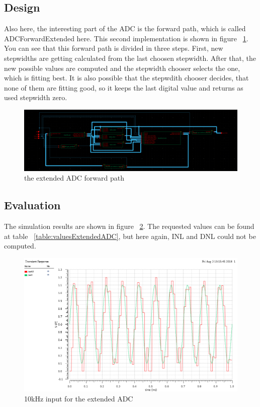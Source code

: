 \subsection{Design}
Also here, the interesting part of the ADC is the forward path, which is called ADCForwardExtended here. This second implementation is shown in figure ~\ref{fig:extendedForward}. You can see that this forward path is divided in three steps. First, new stepwidths are getting calculated from the last choosen stepwidth. After that, the new possible values are computed and the stepwidth chooser selects the one, which is fitting best. It is also possible that the stepwdith chooser decides, that none of them are fitting good, so it keeps the last digital value and returns as used stepwidth zero.

\begin{figure}[h]
	\centering
	\includegraphics[scale=0.225]{images/adc/adcForwardExtended.png}
	\caption{the extended ADC forward path}
	\label{fig:extendedForward}
\end{figure}


\subsection{Evaluation}

The simulation results are shown in figure ~\ref{fig:extendedAdcEvaluation}. The requested values can be found at table ~\ref{table:valuesExtendedADC}, but here again, INL and DNL could not be computed.


\begin{figure}[h]
	\centering
	\includegraphics[scale=0.6]{images/adc/input10kHzExtended.png}
	\caption{10kHz input for the extended ADC}
	\label{fig:extendedAdcEvaluation}
\end{figure}

